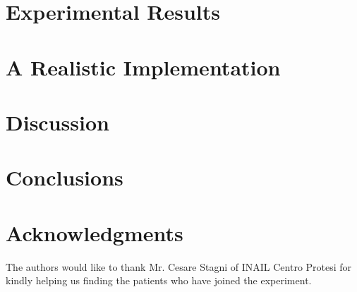 \documentclass[journal]{IEEEtran}
\begin{document}
\section{Experimental Results}
\label{sec:exp}


\section{A Realistic Implementation}
\label{sec:impl}


\section{Discussion}
\label{sec:disc}


\section{Conclusions}
\label{sec:concl}


\section*{Acknowledgments}

The authors would like to thank Mr. Cesare Stagni of INAIL Centro
Protesi for kindly helping us finding the patients who have joined the
experiment.







\end{document}
